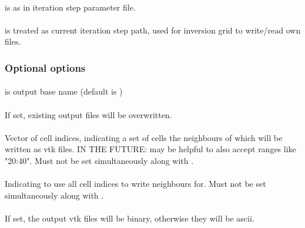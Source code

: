 \paragraph{}
 is  as in \ASKI{} iteration step parameter file.
\paragraph{}
 is treated as current iteration step path, used for inversion grid to write/read own files.
\subsubsection{Optional options}
\paragraph{}
 is output base name (default is )
\paragraph{}
If set, existing output files will be overwritten.
\paragraph{}
Vector of  cell indices, indicating a set of cells the neighbours of which will be written as 
vtk files. IN THE FUTURE: may be helpful to also accept ranges like "20:40".
Must not be set simultaneously along with .
\paragraph{}
Indicating to use all cell indices to write neighbours for. Must not be set simultaneously along with .
\paragraph{}
If set, the output vtk files will be binary, otherwise they will be ascii.
